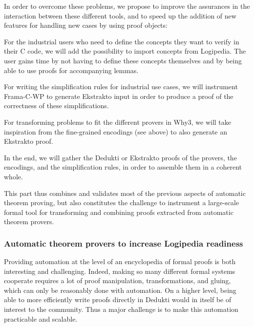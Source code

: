 In order to overcome these problems, we propose to improve the assurances in
the interaction between these different tools, and to speed up the addition of
new features for handling new cases by using proof objects:
\begin{compactitem}
\item For the industrial users who need to define the concepts they want
  to verify in their C code, we will add the possibility to import
  concepts from Logipedia. The user gains time by not having to define
  these concepts themselves and by being able to use proofs for accompanying
  lemmas.

\item For writing the simplification rules for industrial use cases,
  we will instrument Frama-C-WP to generate
  Ekstrakto input in order to produce a proof of the correctness of
  these simplifications.

\item For transforming problems to fit the different provers
  in Why3, we will take inspiration from the fine-grained encodings
  (see above) to also generate an Ekstrakto proof.

\item In the end, we will gather the Dedukti or Ekstrakto proofs of the
  provers, the encodings, and the simplification rules, in order to
  assemble them in a coherent whole.
\end{compactitem}

This part thus combines and validates most of the previous aspects of
automatic theorem proving, but also constitutes the challenge to
instrument a large-scale formal tool for transforming and combining
proofs extracted from automatic theorem provers.

\subsubsection*{Automatic theorem provers to increase Logipedia readiness}

Providing automation at the level of an encyclopedia of formal proofs
is both interesting and challenging. Indeed, making so many different formal
systems cooperate requires a lot of proof manipulation,
transformations, and gluing, which can only be reasonably done with
automation. On a higher level, being able to more efficiently write
proofs directly in Dedukti would in itself be of interest to the community. 
Thus a major challenge is to make this automation practicable and scalable.

